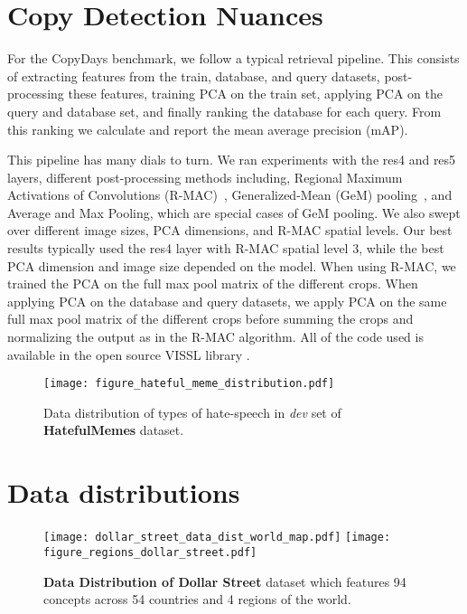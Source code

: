 \documentclass[10pt,twocolumn,letterpaper]{article}
\newcommand{\hateful}{HatefulMemes\xspace}
\begin{document}
\section{Copy Detection Nuances}
\label{sec:appendix_copy_detection_nuances}

For the CopyDays benchmark, we follow a typical retrieval pipeline. This consists of extracting features from the train, database, and query datasets, post-processing these features, training PCA on the train set, applying PCA on the query and database set, and finally ranking the database for each query. From this ranking we calculate and report the mean average precision (mAP).

This pipeline has many dials to turn. We ran experiments with the res4 and res5 layers, different post-processing methods including, Regional Maximum Activations of Convolutions (R-MAC)~\cite{tolias2016particular,caron2018deep}, Generalized-Mean (GeM) pooling~\cite{berman2019multigrain,caron2021emerging}, and Average and Max Pooling, which are special cases of GeM pooling. We also swept over different image sizes, PCA dimensions, and R-MAC spatial levels. Our best results typically used the res4 layer with R-MAC spatial level 3, while the best PCA dimension and image size depended on the model. When using R-MAC, we trained the PCA on the full max pool matrix of the different crops. When applying PCA on the database and query datasets, we apply PCA on the same full max pool matrix of the different crops before summing the crops and normalizing the output as in the R-MAC algorithm. All of the code used is available in the open source VISSL library \cite{goyal2021vissl}.



\begin{figure}[t]
  \centering
  \texttt{[image: figure\_hateful\_meme\_distribution.pdf]}
  \caption{
    Data distribution of types of hate-speech in \textit{dev} set of \textbf{\hateful} dataset.
  }
  \label{fig:hateful_memes_distribution} \end{figure}

\section{Data distributions}

\begin{figure*}[t]
  \centering
  \texttt{[image: dollar\_street\_data\_dist\_world\_map.pdf]}
  \hspace{0.5in}
  \texttt{[image: figure\_regions\_dollar\_street.pdf]}
  \caption{
    \textbf{Data Distribution of Dollar Street} dataset which features 94 concepts across 54 countries and 4 regions of the world.
  }
  \label{fig:dollar_street_data_distribution} \end{figure*}
\end{document}
